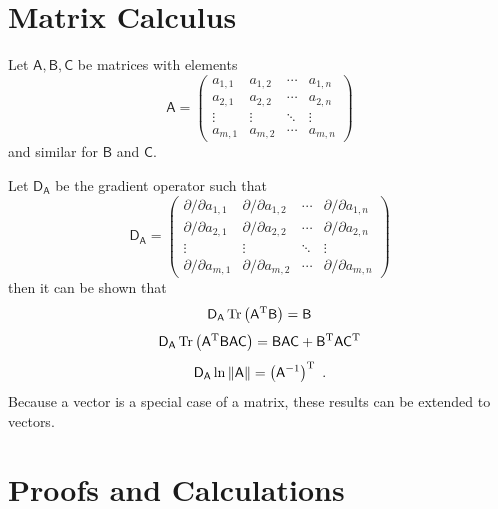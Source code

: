 \documentclass[12pt]{report}
\DeclareMathOperator{\trace}{Tr}
\newcommand{\T}{^\textup{T}}
\newcommand{\matr}[1]{\mathsf{#1}}
\begin{document}
\appendix

\chapter{Matrix Calculus}\label{chapter:matrixCalculus}
Let $\matr{A},\matr{B},\matr{C}$ be matrices with elements
\begin{equation*}
\matr{A}=
\begin{pmatrix}
a_{1,1}&a_{1,2}&\cdots&a_{1,n} \\
a_{2,1}&a_{2,2}&\cdots&a_{2,n} \\
\vdots&\vdots&\ddots&\vdots \\
a_{m,1}&a_{m,2}&\cdots&a_{m,n} 
\end{pmatrix}
\end{equation*}
and similar for $\matr{B}$ and $\matr{C}$.

Let $\matr{D_{A}}$ be the gradient operator such that
\begin{equation*}
\matr{D_{A}}=
\begin{pmatrix}
\partial/\partial a_{1,1}&\partial/\partial a_{1,2}&\cdots&\partial/\partial a_{1,n} \\
\partial/\partial a_{2,1}&\partial/\partial a_{2,2}&\cdots&\partial/\partial a_{2,n} \\
\vdots&\vdots&\ddots&\vdots \\
\partial/\partial a_{m,1}&\partial/\partial a_{m,2}&\cdots&\partial/\partial a_{m,n} 
\end{pmatrix}
\end{equation*}
then it can be shown that \cite{petersen2008matrix}
\begin{equation}
\matr{D_{A}}\trace\left(\matr{A}\T\matr{B}\right) = \matr{B}
\end{equation}
\begin{equation}
\matr{D_{A}}\trace\left(\matr{A}\T\matr{B}\matr{A}\matr{C}\right) = \matr{B}\matr{A}\matr{C}+\matr{B}\T\matr{A}\matr{C}\T
\end{equation}
\begin{equation}
\matr{D_{A}}\ln\left\|\matr{A}\right\| = \left(\matr{A}^{-1}\right)\T \ .
\end{equation}
Because a vector is a special case of a matrix, these results can be extended to vectors.

\chapter{Proofs and Calculations}




\end{document}
